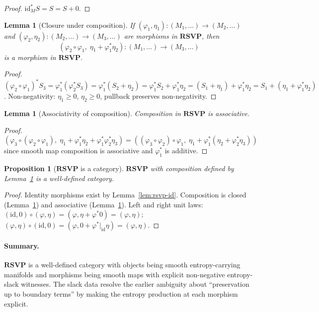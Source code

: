\documentclass[12pt,a4paper]{article}
\newtheorem{proposition}[theorem]{Proposition}
\newtheorem{lemma}[theorem]{Lemma}
\theoremstyle{definition}
\theoremstyle{remark}
\newcommand{\RSVP}{\mathbf{RSVP}}
\providecommand{\id}{\mathrm{id}}
\renewcommand{\id}{\mathrm{id}}
\newcommand{\SF}{S}
\begin{document}
\begin{proof}
$\id_M^*\SF=\SF=\SF+0$.
\end{proof}

\begin{lemma}[Closure under composition]
\label{lem:rsvp-compose}
If $(\varphi_1,\eta_1):(M_1,\ldots)\to(M_2,\ldots)$ and $(\varphi_2,\eta_2):
(M_2,\ldots)\to(M_3,\ldots)$ are morphisms in $\RSVP$, then
\[
  (\varphi_2\circ\varphi_1,\;\eta_1+\varphi_1^*\eta_2)
  :(M_1,\ldots)\to(M_3,\ldots)
\]
is a morphism in $\RSVP$.
\end{lemma}

\begin{proof}
$(\varphi_2\circ\varphi_1)^*\SF_3=\varphi_1^*(\varphi_2^*\SF_3)=\varphi_1^*(\SF_2+\eta_2)
=\varphi_1^*\SF_2+\varphi_1^*\eta_2=(\SF_1+\eta_1)+\varphi_1^*\eta_2
=\SF_1+(\eta_1+\varphi_1^*\eta_2)$.
Non-negativity: $\eta_1\ge 0$, $\eta_2\ge 0$, pullback preserves non-negativity.
\end{proof}

\begin{lemma}[Associativity of composition]
\label{lem:rsvp-assoc}
Composition in $\RSVP$ is associative.
\end{lemma}

\begin{proof}
$(\varphi_3\circ(\varphi_2\circ\varphi_1),\;\eta_1+\varphi_1^*\eta_2+\varphi_1^*\varphi_2^*
\eta_3)=((\varphi_3\circ\varphi_2)\circ\varphi_1,\;\eta_1+\varphi_1^*(\eta_2+\varphi_2^*
\eta_3))$ since smooth map composition is associative and $\varphi_1^*$ is additive.
\end{proof}

\begin{proposition}[$\RSVP$ is a category]
\label{prop:rsvp-cat}
$\RSVP$ with composition defined by Lemma~\ref{lem:rsvp-compose} is a well-defined
category.
\end{proposition}

\begin{proof}
Identity morphisms exist by Lemma~\ref{lem:rsvp-id}. Composition is closed
(Lemma~\ref{lem:rsvp-compose}) and associative (Lemma~\ref{lem:rsvp-assoc}).
Left and right unit laws: $(\id,0)\circ(\varphi,\eta)=(\varphi,\eta+\varphi^*0)
=(\varphi,\eta)$; $(\varphi,\eta)\circ(\id,0)=(\varphi,0+\varphi^*|_{\id}\eta)
=(\varphi,\eta)$.
\end{proof}

\paragraph{Summary.} $\RSVP$ is a well-defined category with objects being smooth
entropy-carrying manifolds and morphisms being smooth maps with explicit non-negative
entropy-slack witnesses. The slack data resolve the earlier ambiguity about
``preservation up to boundary terms'' by making the entropy production at each
morphism explicit.
\end{document}
